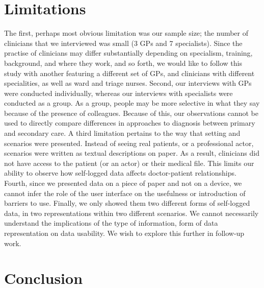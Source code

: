 \documentclass{sigchi}
\begin{document}



\section{Limitations}

The first, perhaps most obvious limitation was our sample size; the number of clinicians that we interviewed was small (3 GPs and 7 specialists).  Since the practise of clinicians may differ substantially depending on specialism, training, background, and where they work, and so forth, we would like to follow this study with another featuring a different set of GPs, and clinicians with different specialities, as well as ward and triage nurses. Second, our interviews with GPs were conducted individually, whereas our interviews with specialists were conducted as a group. As a group, people may be more selective in what they say because of the presence of colleagues. Because of this, our observations cannot be used to directly compare differences in approaches to diagnosis between primary and secondary care.  A third limitation pertains to the way that setting and scenarios were presented. Instead of seeing real patients, or a professional actor, scenarios were written as textual descriptions on paper.  As a result, clinicians did not have access to the patient (or an actor) or their medical file. This limits our ability to observe how self-logged data affects doctor-patient relationships. Fourth, since we presented data on a piece of paper and not on a device, we cannot infer the role of the user interface on the usefulness or introduction of barriers to use. Finally, we only showed them two different forms of self-logged data, in two representations within two different scenarios. We cannot necessarily understand the implications of the type of information, form of data representation on data usability. We wish to explore this further in follow-up work.

\section{Conclusion}


\end{document}
